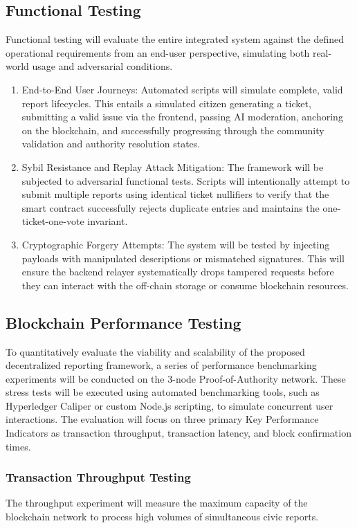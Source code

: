 \subsection{Functional Testing}
Functional testing will evaluate the entire integrated system against the defined operational requirements from an end-user perspective, simulating both real-world usage and adversarial conditions.

\begin{enumerate}
    \item End-to-End User Journeys: Automated scripts will simulate complete, valid report lifecycles. This entails a simulated citizen generating a ticket, submitting a valid issue via the frontend, passing AI moderation, anchoring on the blockchain, and successfully progressing through the community validation and authority resolution states.
    \item Sybil Resistance and Replay Attack Mitigation: The framework will be subjected to adversarial functional tests. Scripts will intentionally attempt to submit multiple reports using identical ticket nullifiers to verify that the smart contract successfully rejects duplicate entries and maintains the one-ticket-one-vote invariant.
    \item Cryptographic Forgery Attempts: The system will be tested by injecting payloads with manipulated descriptions or mismatched signatures. This will ensure the backend relayer systematically drops tampered requests before they can interact with the off-chain storage or consume blockchain resources.
\end{enumerate}

\subsection{Blockchain Performance Testing}
\label{subsec:blockchain-performance-testing}

To quantitatively evaluate the viability and scalability of the proposed decentralized reporting framework, a series of performance benchmarking experiments will be conducted on the 3-node Proof-of-Authority network. These stress tests will be executed using automated benchmarking tools, such as Hyperledger Caliper or custom Node.js scripting, to simulate concurrent user interactions. The evaluation will focus on three primary Key Performance Indicators as transaction throughput, transaction latency, and block confirmation times.

\subsubsection{Transaction Throughput Testing}
The throughput experiment will measure the maximum capacity of the blockchain network to process high volumes of simultaneous civic reports.

